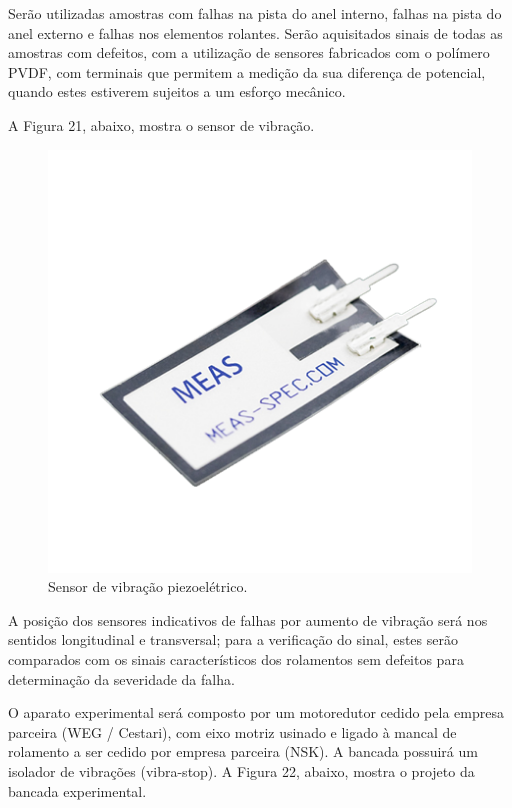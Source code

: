 \documentclass[
	12pt,				
	oneside,			
	a4paper,			
	english,			
	brazil				
	]{abntex2ppgsi}
\begin{document}
Serão utilizadas amostras com falhas na pista do anel interno, falhas na pista do anel externo e falhas nos elementos rolantes. Serão aquisitados sinais de todas as amostras com defeitos, com a utilização de sensores fabricados com o polímero PVDF, com terminais que permitem a medição da sua diferença de potencial, quando estes estiverem sujeitos a um esforço mecânico.

A Figura 21, abaixo, mostra o sensor de vibração. 

\begin{figure}[!htb]
\centering
\includegraphics{Figura21}
\caption {Sensor de vibração piezoelétrico.}
\label{Figura21}
\end{figure} 

A posição dos sensores indicativos de falhas por aumento de vibração será nos sentidos longitudinal e transversal; para a verificação do sinal, estes serão comparados com os sinais característicos dos rolamentos sem defeitos para determinação da severidade da falha.

O aparato experimental será composto por um motoredutor cedido pela empresa parceira (WEG / Cestari), com eixo motriz usinado e ligado à mancal de rolamento a ser cedido por empresa parceira (NSK). A bancada possuirá um isolador de vibrações (vibra-stop). A Figura 22, abaixo, mostra o projeto da bancada experimental.
\end{document}
